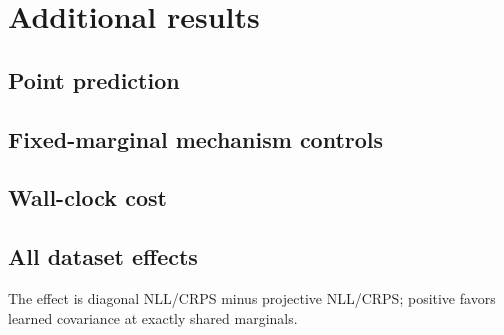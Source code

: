 \section{Additional results}\label{app:additional}

\subsection{Point prediction}

\begin{table}[h]
\caption{Point prediction macro-averaged over 35 datasets.  TabDPT-Turbo is
mean-only, so distributional entries are intentionally blank.}
\label{tab:point}
\centering

\end{table}

\subsection{Fixed-marginal mechanism controls}

\begin{table}[h]
\caption{Correlation mechanism controls with the same TabICLv2 means and
marginal variances.  Positive $\Delta$NLL favors the row-correlation model over
the exact diagonal.  The shuffled, hidden-cosine, and raw-feature controls are
PSD and preserve the diagonal but do not use the trained head as intended.}
\label{tab:controls}
\centering

\end{table}

\subsection{Wall-clock cost}

\begin{table}[h]
\caption{Per-episode wall-clock prediction time on the evaluation panel.  The
TabICLv2 row reports one context fit plus 48 singleton calls; timings include
model prediction but not cache serialization or scoring.  Hardware was two
NVIDIA H100 GPUs for neural models and CPU for classical baselines.}
\label{tab:timing}
\centering

\end{table}

\subsection{All dataset effects}

The effect is diagonal NLL/CRPS minus projective NLL/CRPS; positive favors
learned covariance at exactly shared marginals.

